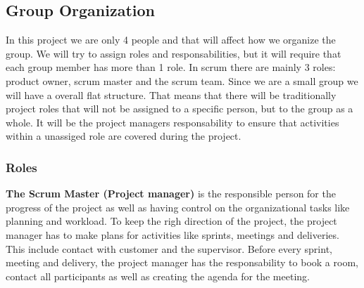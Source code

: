 \clearpage
\subsection{Group Organization}

In this project we are only 4 people and that will affect how we organize 
the group. We will try to assign roles and responsabilities, but it will
require that each group member has more than 1 role.
In scrum there are mainly 3 roles: product owner, scrum master and the
scrum team. Since we are a small group we will have a overall flat structure. That means that
there will be traditionally project roles that will not be assigned to a specific person, 
but to the group as a whole. It will be the project managers responsability to ensure 
that activities within a unassiged role are covered during the project.

\subsubsection{Roles}

{\bf The Scrum Master (Project manager)} is the responsible person for the progress of the project 
as well as having control on the organizational tasks like planning and workload.
To keep the righ direction of the project, the project manager has to make plans for 
activities like sprints, meetings and deliveries. This include contact with customer and the supervisor.
Before every sprint, meeting and delivery, the project manager has the responsability to book a room, contact all
participants as well as creating the agenda for the meeting. \\


